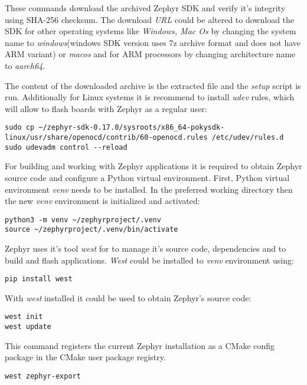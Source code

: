 \documentclass[twoside, 12pt]{article}
\begin{document}
These commands download the archived Zephyr SDK and verify it's integrity using SHA-256 
checksum. The download \textit{URL} could be altered to download the SDK for other operating 
systems like \textit{Windows, Mac Os} by changing the system name to \textit{windows}(windows 
SDK version uses 7z archive format and does not have ARM variant) or \textit{macos} and for 
ARM processors by changing architecture name to \textit{aarch64}.

The content of the downloaded archive is the extracted file and the \textit{ setup} script is 
run. Additionally for Linux systems it is recommend to install \textit{udev} rules, which 
will allow to flash boards with Zephyr as a regular user:
\begin{lstlisting}[caption=Installing udev rules,breaklines=true]
sudo cp ~/zephyr-sdk-0.17.0/sysroots/x86_64-pokysdk-linux/usr/share/openocd/contrib/60-openocd.rules /etc/udev/rules.d
sudo udevadm control --reload
\end{lstlisting}

For building and working with Zephyr applications it is required to obtain Zephyr source code 
and configure a Python virtual environment. First, Python virtual environment \textit{venv} 
needs to be installed. In the preferred working directory then the new \textit{venv} 
environment is initialized and activated:
\begin{lstlisting}[caption=Creating and activating Python venv environment]
python3 -m venv ~/zephyrproject/.venv
source ~/zephyrproject/.venv/bin/activate
\end{lstlisting}

Zephyr uses it's tool \textit{west} for to manage it's source code, dependencies and to build 
and flash applications. \textit{West} could be installed to \textit{venv} environment using:
\begin{lstlisting}[caption=Installing Zephyr's West tool]
pip install west
\end{lstlisting}

With \textit{west} installed it could be used to obtain Zephyr's source code:
\begin{lstlisting}[caption=Obtaining Zephyr's source code]
west init
west update
\end{lstlisting}

This command registers the current Zephyr installation as a CMake config package in the CMake user package registry.\cite{zephyr_cmake_commands}
\begin{lstlisting}
west zephyr-export
\end{lstlisting}
\end{document}
